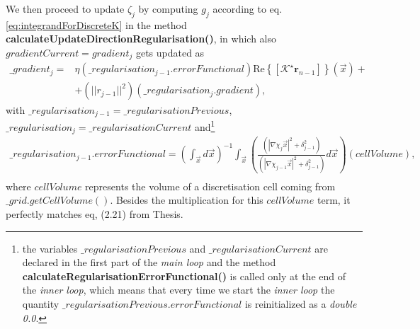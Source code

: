 \documentclass[10pt,a4paper]{article}
\newcommand{\real}[1]{\text{Re} \left\{ #1 \right\}}
\begin{document}
{
We then proceed to update $\zeta_j$ by computing $g_j$ according to eq. \eqref{eq:integrandForDiscreteK} in the method \textbf{calculateUpdateDirectionRegularisation()}, in which also $gradientCurrent = gradient_j$ gets updated as 
\begin{align}
\_gradient_j = &\eta (\_regularisation_{j-1}.errorFunctional)\real{[\mathcal{K}^\star\mathbf{r}_{n-1}]}(\vec{x}) + \\
&+ (||r_{j-1}||^2)( \_regularisation_j.gradient),
\end{align}
with $\_regularisation_{j-1} =\_regularisationPrevious$,  $\_regularisation_{j} =\_regularisationCurrent$ and\footnote{the variables $\_regularisationPrevious$ and $\_regularisationCurrent$ are declared in the first part of the \textit{main loop} and the method \textbf{calculateRegularisationErrorFunctional()} is called only at the end of the \textit{inner loop}, which means that every time we start the \textit{inner loop} the quantity $\_regularisationPrevious.errorFunctional$ is reinitialized as a \textit{double  0.0}.}
\begin{align} \label{eq:RegPrevious.Freg}
\_regularisation_{j-1}.errorFunctional =  (\int_{\vec{x}} d\vec{x})^{-1} \int_{\vec{x}} \left(\frac{(|\nabla \chi_j\vec{x}|^2 +\delta^2_{j-1})}{(|\nabla \chi_{j-1}\vec{x}|^2 +\delta^2_{j-1})}  d\vec{x}\right) (cellVolume), \\
\tag*{( calculateRegularisationErrorFunctional() )}
\end{align}
where $cellVolume$ represents the volume of a discretisation cell coming from $\_grid.getCellVolume()$.
Besides the multiplication for this $cellVolume$ term, it perfectly matches eq, (2.21) from Thesis.
\newline

}
\end{document}
